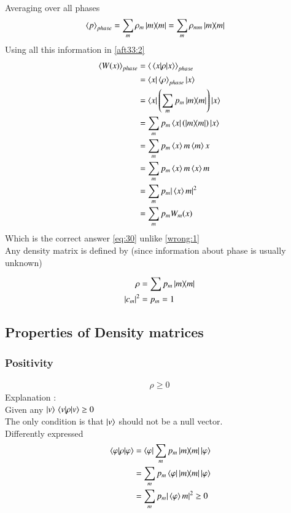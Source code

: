 Averaging over all phases 
\begin{align}\label{aft33:6}
\left\langle{p}\right\rangle _{phase} & = \sum_{m} {\rho}_{m}\dyad{m}{m} = \sum_{m} {\rho}_{mm}\dyad{m}{m}
\end{align}
Using all this information in \eqref{aft33:2}
\begin{align}\label{aft33:7}
\left\langle{W}(x)\right\rangle _{phase} &= \left\langle\expval{\rho}{x}\right\rangle_{phase}\\
&=\bra{x}\left\langle{\rho}\right\rangle_{phase}\ket{x}\\
&=\bra{x}\left(\sum_{m} {p}_{m}\dyad{m}{m}\right) \ket{x}\\
&=\sum_{m} {p}_{m}\bra{x}\left(\dyad{m}{m}\right) \ket{x}\notag\\
&=\sum_{m} {p}_{m}\braket{x}{m} \braket{m}{x}\notag\\
&=\sum_{m} {p}_{m}\braket{x}{m} \braket{x}{m}\notag\\
&=\sum_{m} {p}_{m}\vert\braket{x}{m}\vert^{2}\notag\\
&=\sum_{m} {p}_{m} W_{m}{(x)}
\end{align}
Which is the correct answer \eqref{eq:30} unlike \eqref{wrong:1}\\
Any density matrix is defined by (since information about phase is usually unknown)

\begin{align}
\rho &= \sum p_{m}\dyad{m}\\
\vert c_{m}\vert^{2}&=p_{m}=1 
\end{align}

\subsection{Properties of Density matrices}
\subsubsection{Positivity}

\begin{align}\label{aft33:8}
\rho \geq 0
\end{align}
Explanation : \\
Given any $\ket{v}\expval{\rho}{v} \geq {0}$\\
The only condition is that $\ket{v}$ should not be  a null vector. \\


Differently expressed\\ 
\begin{align}\label{aft33:9}
\expval{\rho}{\varphi}&=\bra{\varphi}{\sum_{m}p_{m}}\dyad{m}\ket{\varphi}\notag\\
&={\sum_{m}p_{m}}\bra{\varphi}\dyad{m}\ket{\varphi}\notag\\
&={\sum_{m}p_{m}}\vert\braket{\varphi}{m}\vert^{2}\geq{0}
\end{align}

